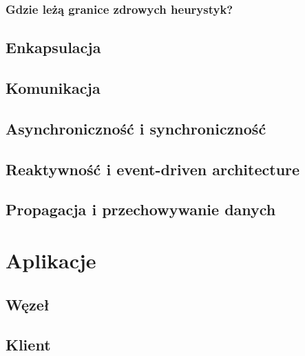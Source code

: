 \subsubsection{Gdzie leżą granice zdrowych heurystyk?}

\subsection{Enkapsulacja}

\subsection{Komunikacja}

\subsection{Asynchroniczność i synchroniczność}

\subsection{Reaktywność i event-driven architecture}

\subsection{}

\subsection{Propagacja i przechowywanie danych}
\label{sec:dataPropagation}


\section{Aplikacje}

\subsection{Węzeł}
\subsection{Klient}

